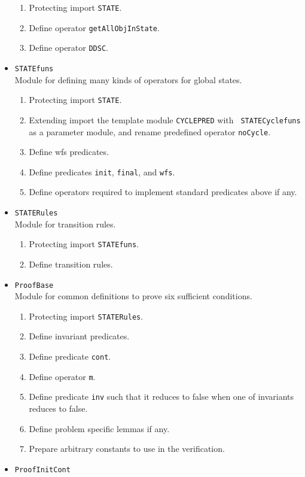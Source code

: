 \documentclass[12pt]{report}
\begin{document}
\begin{itemize}
  \begin{enumerate}
  \item Protecting import {\tt STATE}.
  \item Define operator {\tt getAllObjInState}.
  \item Define operator {\tt DDSC}.
  \end{enumerate}
\item {\tt STATEfuns}\\
  Module for defining many kinds of operators for global states.
  \begin{enumerate}
  \item Protecting import {\tt STATE}.
  \item Extending import the template module {\tt CYCLEPRED} with {\tt
    STATECyclefuns} as a parameter module, and rename predefined
    operator {\tt noCycle}.
  \item Define wfs predicates.
  \item Define predicates {\tt init}, {\tt final}, and {\tt wfs}.
  \item Define operators required to implement standard predicates
    above if any.
  \end{enumerate}
\item {\tt STATERules}\\
  Module for transition rules.
  \begin{enumerate}
  \item Protecting import {\tt STATEfuns}.
  \item Define transition rules.
  \end{enumerate}
\item {\tt ProofBase}\\
  Module for common definitions to prove six sufficient conditions.
  \begin{enumerate}
  \item Protecting import {\tt STATERules}.
  \item Define invariant predicates.
  \item Define predicate {\tt cont}.
  \item Define operator {\tt m}.
  \item Define predicate {\tt inv} such that it reduces to false when
    one of invariants reduces to false.
  \item Define problem specific lemmas if any.
  \item Prepare arbitrary constants to use in the verification.
  \end{enumerate}
\item {\tt ProofInitCont}\\

\end{itemize}
\end{document}
